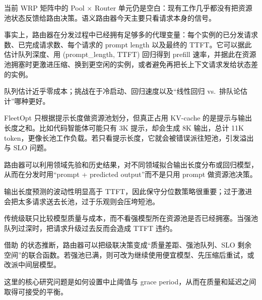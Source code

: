 \begin{opportunity}[从路由侧可观测量推断资源池状态]
\label{opp:pool-feedback}
当前 WRP 矩阵中的 Pool $\times$ Router 单元仍是空白：现有工作几乎都没有把资源池状态反馈给路由决策。语义路由器今天主要只看请求本身的信号。

事实上，路由器在分发过程中已经拥有足够多的代理变量：每个实例的已分发请求数、已完成请求数、每个请求的 prompt length 以及最终的 TTFT。它可以据此估计队列深度、用 (prompt\_length, TTFT) 回归得到 prefill 速率，并据此在资源池拥塞时更激进压缩、换到更空闲的实例，或者避免再把长上下文请求发给状态差的实例。

\begin{frisk}
队列估计近乎零成本；挑战在于冷启动、回归速度以及“线性回归 vs.\ 排队论估计”哪种更好。
\end{frisk}
\end{opportunity}

\begin{opportunity}[输出长度感知的资源池路由]
\label{opp:output-length}
FleetOpt 只根据提示长度做资源池划分，但真正占用 KV-cache 的是提示与输出长度之和。比如代码智能体可能只有 3K 提示，却会生成 8K 输出，总计 11K token，更像长池工作负载。若只看提示长度，它就会被错误派往短池，引发溢出与 SLO 问题。

路由器可以利用领域先验和历史结果，对不同领域拟合输出长度分布或回归模型，从而在分发时用“prompt + predicted output”而不是只用 prompt 做资源池决策。

\begin{frisk}
输出长度预测的波动性明显高于 TTFT，因此保守分位数策略很重要；过于激进会把太多请求送去长池，过于乐观则会压垮短池。
\end{frisk}
\end{opportunity}

\begin{opportunity}[资源池感知的级联]
\label{opp:pool-cascade}
传统级联只比较模型质量与成本，而不看强模型所在资源池是否已经拥塞。当强池队列过深时，把请求升级过去反而会造成 TTFT 违约。

借助  的状态推断，路由器可以把级联决策变成“质量差距、强池队列、SLO 剩余空间”的联合函数。若强池已满，则可改为继续使用便宜模型、先压缩后重试，或改派中间层模型。

\begin{frisk}
这里的核心研究问题是如何设置中止阈值与 grace period，从而在质量和延迟之间取得可接受的平衡。
\end{frisk}
\end{opportunity}

